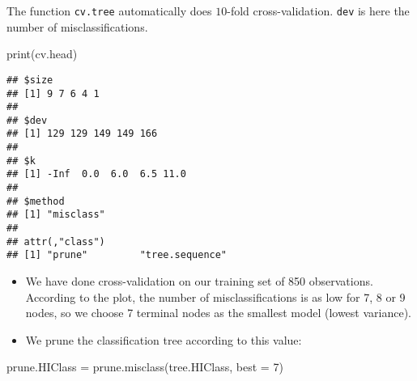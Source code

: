 \documentclass[
  10pt,
  ignorenonframetext,
]{beamer}
\newenvironment{Shaded}{\begin{snugshade}}{\end{snugshade}}
\newcommand{\AttributeTok}[1]{\textcolor[rgb]{0.77,0.63,0.00}{#1}}
\newcommand{\DecValTok}[1]{\textcolor[rgb]{0.00,0.00,0.81}{#1}}
\newcommand{\FunctionTok}[1]{\textcolor[rgb]{0.00,0.00,0.00}{#1}}
\newcommand{\NormalTok}[1]{#1}
\newcommand{\OtherTok}[1]{\textcolor[rgb]{0.56,0.35,0.01}{#1}}
\begin{document}
\begin{frame}[fragile]
The function \texttt{cv.tree} automatically does \(10\)-fold
cross-validation. \texttt{dev} is here the number of misclassifications.

\vspace{3mm}

\scriptsize

\begin{Shaded}
\begin{Highlighting}[]
\FunctionTok{print}\NormalTok{(cv.head)}
\end{Highlighting}
\end{Shaded}

\begin{verbatim}
## $size
## [1] 9 7 6 4 1
## 
## $dev
## [1] 129 129 149 149 166
## 
## $k
## [1] -Inf  0.0  6.0  6.5 11.0
## 
## $method
## [1] "misclass"
## 
## attr(,"class")
## [1] "prune"         "tree.sequence"
\end{verbatim}
\end{frame}

\begin{frame}[fragile]
\begin{itemize}
\item
  We have done cross-validation on our training set of 850 observations.
  According to the plot, the number of misclassifications is as low for
  7, 8 or 9 nodes, so we choose 7 terminal nodes as the smallest model
  (lowest variance).
\item
  We prune the classification tree according to this value:
\end{itemize}

\vspace{4mm}

\scriptsize

\begin{Shaded}
\begin{Highlighting}[]
\NormalTok{prune.HIClass }\OtherTok{=} \FunctionTok{prune.misclass}\NormalTok{(tree.HIClass, }\AttributeTok{best =} \DecValTok{7}\NormalTok{)}
\end{Highlighting}
\end{Shaded}
\end{frame}
\end{document}
